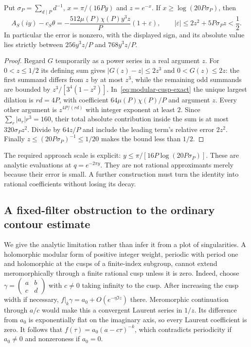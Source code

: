 \begin{proposition}\label{prop:modular-cusp}
Put $\sigma_P=\sum_{d\mid P}d^{-1}$, $x=\pi/(16Py)$ and $z=e^{-x}$.
If $x\geq\log(20P\sigma_P)$, then
\begin{equation}\label{eq:modular-cusp-bound}
 A_S(iy)-c_S\theta
  =-\frac{512\mu(P)\chi(P)y^3z}{P}(1+\varepsilon),\qquad
 |\varepsilon|\leq2z^2+5P\sigma_Pz<\frac12.
\end{equation}
In particular the error is nonzero, with the displayed sign, and its
absolute value lies strictly between $256y^3z/P$ and $768y^3z/P$.
\end{proposition}
\begin{proof}
Regard $G$ temporarily as a power series in a real argument $z$.
For $0<z\leq1/2$ its defining sum gives
$|G(z)-z|\leq2z^3$ and $0<G(z)\leq2z$:
the first summand differs from $z$ by at most $z^3$, while the
remaining odd summands are bounded by
$z^3/[3^4(1-z^2)]$.
In~\eqref{eq:modular-cusp-exact} the unique largest dilation is
$rd=4P$, with coefficient $64\mu(P)\chi(P)/P$ and argument $z$.
Every other argument is $z^{4P/(rd)}$ with integer exponent at least
$2$. Since $\sum_r|a_r|r^3=160$, their total absolute contribution
inside the sum is at most $320\sigma_Pz^2$. Divide by $64z/P$ and
include the leading term's relative error $2z^2$.
Finally $z\leq(20P\sigma_P)^{-1}\leq1/20$ makes the bound less
than $1/2$.
\end{proof}
The required approach scale is explicit:
$y\leq\pi/[16P\log(20P\sigma_P)]$. These are analytic evaluations
at $q=e^{-2\pi y}$. They are not rational approximants merely because
their error is small. A further construction must turn the identity
into rational coefficients without losing its decay.

\subsection{A fixed-filter obstruction to the ordinary contour estimate}
We give the analytic limitation rather than infer it from a plot of
singularities. A holomorphic modular form of positive integer weight,
periodic with period one and holomorphic at the cusps of a finite-index
subgroup, cannot extend meromorphically through a finite rational cusp
unless it is zero. Indeed, choose
$\gamma=\left(\begin{smallmatrix}a&b\\c&d\end{smallmatrix}\right)$
with $c\ne0$ taking infinity to the cusp. After increasing the cusp
width if necessary, $f|_k\gamma=a_0+O(e^{-\eta\Im z})$ there.
Meromorphic continuation through $a/c$ would make this a convergent
Laurent series in $1/z$. Its difference from $a_0$ is exponentially
flat on the imaginary axis, so every Laurent coefficient is zero.
It follows that $f(\tau)=a_0(a-c\tau)^{-k}$, which contradicts
periodicity if $a_0\ne0$ and nonzeroness if $a_0=0$.

